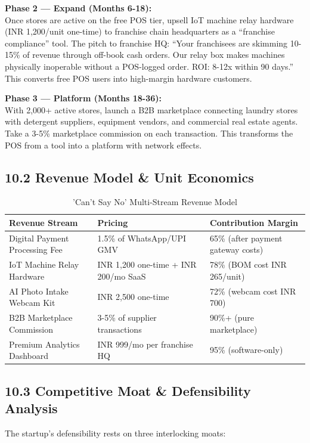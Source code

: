 \documentclass[11pt,a4paper]{article}
\begin{document}
\vspace{0.3cm}
\textbf{Phase 2 --- Expand (Months 6-18):}\\
Once stores are active on the free POS tier, upsell IoT machine relay hardware (INR 1,200/unit one-time) to franchise chain headquarters as a ``franchise compliance'' tool. The pitch to franchise HQ: ``Your franchisees are skimming 10-15\% of revenue through off-book cash orders. Our relay box makes machines physically inoperable without a POS-logged order. ROI: 8-12x within 90 days.'' This converts free POS users into high-margin hardware customers.

\vspace{0.3cm}
\textbf{Phase 3 --- Platform (Months 18-36):}\\
With 2,000+ active stores, launch a B2B marketplace connecting laundry stores with detergent suppliers, equipment vendors, and commercial real estate agents. Take a 3-5\% marketplace commission on each transaction. This transforms the POS from a tool into a platform with network effects.

\subsection{10.2 Revenue Model \& Unit Economics}

\begin{table}[h!]
\centering
\small
\begin{tabularx}{\textwidth}{XXX}
\toprule
\textbf{Revenue Stream} & \textbf{Pricing} & \textbf{Contribution Margin} \\
\midrule
Digital Payment Processing Fee & 1.5\% of WhatsApp/UPI GMV & 65\% (after payment gateway costs) \\
IoT Machine Relay Hardware & INR 1,200 one-time + INR 200/mo SaaS & 78\% (BOM cost INR 265/unit) \\
AI Photo Intake Webcam Kit & INR 2,500 one-time & 72\% (webcam cost INR 700) \\
B2B Marketplace Commission & 3-5\% of supplier transactions & 90\%+ (pure marketplace) \\
Premium Analytics Dashboard & INR 999/mo per franchise HQ & 95\% (software-only) \\
\bottomrule
\end{tabularx}
\caption{'Can't Say No' Multi-Stream Revenue Model}
\end{table}

\subsection{10.3 Competitive Moat \& Defensibility Analysis}
The startup's defensibility rests on three interlocking moats:
\end{document}
